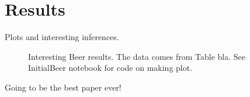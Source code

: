 \documentclass{aastex62}
\begin{document}



\section{Results} \label{sec:style}
Plots and interesting inferences.
\begin{figure}[ht!]
\caption{Interesting Beer results. The data comes from Table bla. See InitialBeer notebook for code on making plot.}
\end{figure}


\begin{thebibliography}{}
Going to be the best paper ever!

\end{thebibliography}
\end{document}
